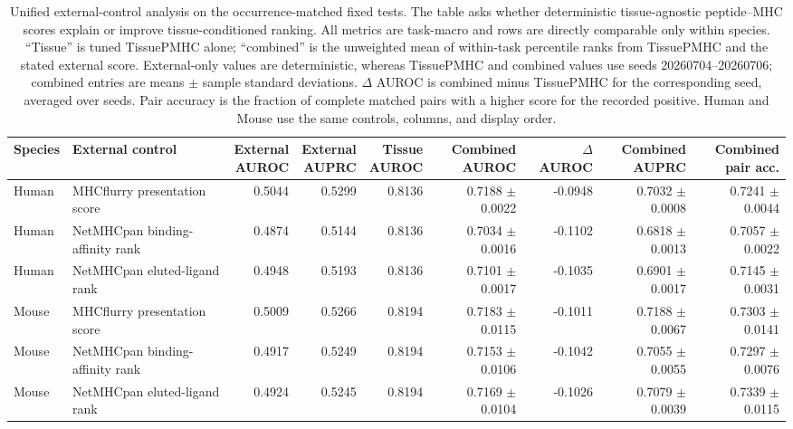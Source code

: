 \begin{table}[t]
\centering
\caption{Unified external-control analysis on the occurrence-matched fixed tests. The table asks whether deterministic tissue-agnostic peptide--MHC scores explain or improve tissue-conditioned ranking. All metrics are task-macro and rows are directly comparable only within species. ``Tissue'' is tuned TissuePMHC alone; ``combined'' is the unweighted mean of within-task percentile ranks from TissuePMHC and the stated external score. External-only values are deterministic, whereas TissuePMHC and combined values use seeds 20260704--20260706; combined entries are means $\pm$ sample standard deviations. $\Delta$ AUROC is combined minus TissuePMHC for the corresponding seed, averaged over seeds. Pair accuracy is the fraction of complete matched pairs with a higher score for the recorded positive. Human and Mouse use the same controls, columns, and display order.}
\label{tab:rq6-method-comparison}
\fontsize{7.0}{8.0}\selectfont
\setlength{\tabcolsep}{1.6pt}
\begin{tabularx}{\textwidth}{@{}l>{\raggedright\arraybackslash}Xrrrrrrr@{}}
\toprule
Species & External control & \shortstack{External\\AUROC} & \shortstack{External\\AUPRC} & \shortstack{Tissue\\AUROC} & \shortstack{Combined\\AUROC} & \shortstack{$\Delta$\\AUROC} & \shortstack{Combined\\AUPRC} & \shortstack{Combined\\pair acc.} \\
\midrule
Human & MHCflurry presentation score & 0.5044 & 0.5299 & 0.8136 & 0.7188 $\pm$ 0.0022 & -0.0948 & 0.7032 $\pm$ 0.0008 & 0.7241 $\pm$ 0.0044 \\
Human & NetMHCpan binding-affinity rank & 0.4874 & 0.5144 & 0.8136 & 0.7034 $\pm$ 0.0016 & -0.1102 & 0.6818 $\pm$ 0.0013 & 0.7057 $\pm$ 0.0022 \\
Human & NetMHCpan eluted-ligand rank & 0.4948 & 0.5193 & 0.8136 & 0.7101 $\pm$ 0.0017 & -0.1035 & 0.6901 $\pm$ 0.0017 & 0.7145 $\pm$ 0.0031 \\
\midrule
Mouse & MHCflurry presentation score & 0.5009 & 0.5266 & 0.8194 & 0.7183 $\pm$ 0.0115 & -0.1011 & 0.7188 $\pm$ 0.0067 & 0.7303 $\pm$ 0.0141 \\
Mouse & NetMHCpan binding-affinity rank & 0.4917 & 0.5249 & 0.8194 & 0.7153 $\pm$ 0.0106 & -0.1042 & 0.7055 $\pm$ 0.0055 & 0.7297 $\pm$ 0.0076 \\
Mouse & NetMHCpan eluted-ligand rank & 0.4924 & 0.5245 & 0.8194 & 0.7169 $\pm$ 0.0104 & -0.1026 & 0.7079 $\pm$ 0.0039 & 0.7339 $\pm$ 0.0115 \\
\bottomrule
\end{tabularx}
\end{table}

